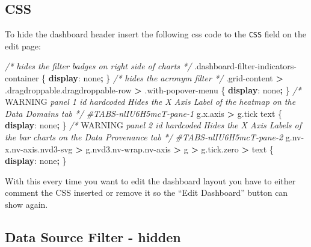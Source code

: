 \documentclass[
]{book}
\newenvironment{Shaded}{\begin{snugshade}}{\end{snugshade}}
\newcommand{\AlertTok}[1]{\textcolor[rgb]{0.94,0.16,0.16}{#1}}
\newcommand{\CommentTok}[1]{\textcolor[rgb]{0.56,0.35,0.01}{\textit{#1}}}
\newcommand{\DecValTok}[1]{\textcolor[rgb]{0.00,0.00,0.81}{#1}}
\newcommand{\FunctionTok}[1]{\textcolor[rgb]{0.00,0.00,0.00}{#1}}
\newcommand{\KeywordTok}[1]{\textcolor[rgb]{0.13,0.29,0.53}{\textbf{#1}}}
\newcommand{\NormalTok}[1]{#1}
\newcommand{\OperatorTok}[1]{\textcolor[rgb]{0.81,0.36,0.00}{\textbf{#1}}}
\newcommand{\PreprocessorTok}[1]{\textcolor[rgb]{0.56,0.35,0.01}{\textit{#1}}}
\begin{document}
\hypertarget{css-1}{%
\subsection*{CSS}\label{css-1}}

To hide the dashboard header insert the following css code to the \texttt{CSS} field on the edit page:

\begin{Shaded}
\begin{Highlighting}[]
\CommentTok{/* hides the filter badges on right side of charts */}
\FunctionTok{.dashboard{-}filter{-}indicators{-}container}\NormalTok{ \{}
    \KeywordTok{display}\NormalTok{: }\DecValTok{none}\OperatorTok{;}
\NormalTok{\}}
\CommentTok{/* hides the acronym filter */}
\FunctionTok{.grid{-}content} \OperatorTok{\textgreater{}} \FunctionTok{.dragdroppable.dragdroppable{-}row} \OperatorTok{\textgreater{}} \FunctionTok{.with{-}popover{-}menu}\NormalTok{ \{}
    \KeywordTok{display}\NormalTok{: }\DecValTok{none}\OperatorTok{;}
\NormalTok{\}}
\CommentTok{/*}
\AlertTok{WARNING}\CommentTok{ panel 1 id hardcoded}
\CommentTok{Hides the X Axis Label of the heatmap on the Data Domains tab}
\CommentTok{*/}
\PreprocessorTok{\#TABS{-}nlIU6H5mcT{-}pane{-}1}\NormalTok{ g}\FunctionTok{.x.axis} \OperatorTok{\textgreater{}}\NormalTok{ g}\FunctionTok{.tick}\NormalTok{ text \{}
    \KeywordTok{display}\NormalTok{: }\DecValTok{none}\OperatorTok{;}
\NormalTok{\}}
\CommentTok{/*}
\AlertTok{WARNING}\CommentTok{ panel 2 id hardcoded}
\CommentTok{Hides the X Axis Labels of the bar charts on the Data Provenance tab}
\CommentTok{*/}
\PreprocessorTok{\#TABS{-}nlIU6H5mcT{-}pane{-}2}\NormalTok{ g}\FunctionTok{.nv{-}x.nv{-}axis.nvd3{-}svg} \OperatorTok{\textgreater{}}\NormalTok{ g}\FunctionTok{.nvd3.nv{-}wrap.nv{-}axis} \OperatorTok{\textgreater{}}\NormalTok{ g }\OperatorTok{\textgreater{}}\NormalTok{ g}\FunctionTok{.tick.zero} \OperatorTok{\textgreater{}}\NormalTok{ text \{}
    \KeywordTok{display}\NormalTok{: }\DecValTok{none}\OperatorTok{;}
\NormalTok{\}}
\end{Highlighting}
\end{Shaded}

With this every time you want to edit the dashboard layout you have to either comment the CSS inserted
or remove it so the ``Edit Dashboard'' button can show again.

\hypertarget{data-source-filter---hidden}{%
\subsection*{Data Source Filter - hidden}\label{data-source-filter---hidden}}
\end{document}
